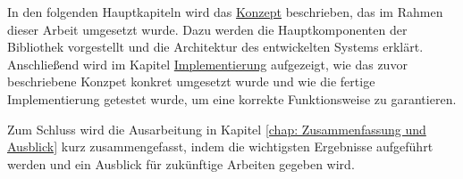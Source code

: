 In den folgenden Hauptkapiteln wird das \hyperref[chap: Konzept]{Konzept} beschrieben, das im Rahmen dieser Arbeit umgesetzt wurde. Dazu werden die Hauptkomponenten der Bibliothek vorgestellt und die Architektur des entwickelten Systems erklärt. Anschließend wird im Kapitel \hyperref[chap: Implementierung und Test]{Implementierung} aufgezeigt, wie das zuvor beschriebene Konzpet konkret umgesetzt wurde und wie die fertige Implementierung getestet wurde, um eine korrekte Funktionsweise zu garantieren.


Zum Schluss wird die Ausarbeitung in Kapitel \ref{chap: Zusammenfassung und Ausblick} kurz zusammengefasst, indem die wichtigsten Ergebnisse aufgeführt werden und ein Ausblick für zukünftige Arbeiten gegeben wird.  